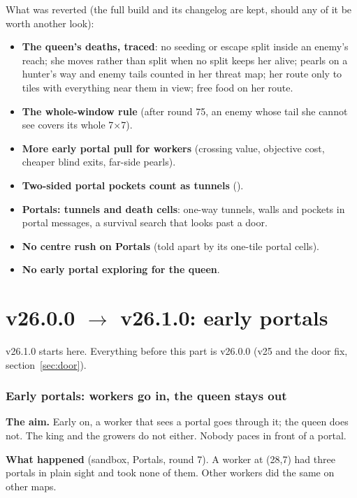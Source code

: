 \documentclass[11pt,a4paper]{article}
\newcommand{\code}[1]{\texttt{\detokenize{#1}}}
\begin{document}
What was reverted (the full build and its changelog are kept, should any of it be worth another look):
\begin{itemize}
  \item \textbf{The queen's deaths, traced}: no seeding or escape split inside an enemy's reach; she moves rather than split
        when no split keeps her alive; pearls on a hunter's way and enemy tails counted in her threat map; her route only to
        tiles with everything near them in view; free food on her route.
  \item \textbf{The whole-window rule} (after round 75, an enemy whose tail she cannot see covers its whole 7$\times$7).
  \item \textbf{More early portal pull for workers} (crossing value, objective cost, cheaper blind exits, far-side pearls).
  \item \textbf{Two-sided portal pockets count as tunnels} (\code{portal_pocket_worth}).
  \item \textbf{Portals: tunnels and death cells}: one-way tunnels, walls and pockets in portal messages, a survival search that
        looks past a door.
  \item \textbf{No centre rush on Portals} (told apart by its one-tile portal cells).
  \item \textbf{No early portal exploring for the queen}.
\end{itemize}

\part{v26.0.0 $\rightarrow$ v26.1.0: early portals}
v26.1.0 starts here. Everything before this part is v26.0.0 (v25 and the door fix, section~\ref{sec:door}).

\section{Early portals: workers go in, the queen stays out}\label{sec:earlyportals}
\textbf{The aim.} Early on, a worker that sees a portal goes through it; the queen does not. The king and the growers do not
either. Nobody paces in front of a portal.

\textbf{What happened} (sandbox, Portals, round 7). A worker at (28,7) had three portals in plain sight and took none of them.
Other workers did the same on other maps.
\end{document}
